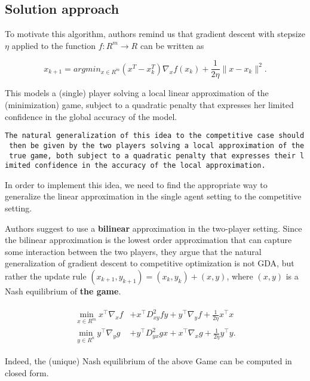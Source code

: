 \documentclass[11pt]{article}
\begin{document}
    \subsection{Solution approach}\label{solution-approach}

To motivate this algorithm, authors remind us that gradient descent with
stepsize \(\eta\) applied to the function \(f:R^m \longrightarrow R\)
can be written as

\begin{equation}
        x_{k+1} = argmin_{x \in R^m} (x^T - x_{k}^T) \nabla_x f(x_k) + \frac{1}{2\eta} \|x - x_{k}\|^2.
    \end{equation}

This models a (single) player solving a local linear approximation of
the (minimization) game, subject to a quadratic penalty that expresses
her limited confidence in the global accuracy of the model.

\texttt{The\ natural\ generalization\ of\ this\ idea\ to\ the\ competitive\ case\ should\ then\ be\ given\ by\ the\ two\ players\ solving\ a\ local\ approximation\ of\ the\ true\ game,\ both\ subject\ to\ a\ quadratic\ penalty\ that\ expresses\ their\ limited\ confidence\ in\ the\ accuracy\ of\ the\ local\ approximation.}

In order to implement this idea, we need to find the appropriate way to
generalize the linear approximation in the single agent setting to the
competitive setting.

Authors suggest to use a \textbf{bilinear} approximation in the
two-player setting. Since the bilinear approximation is the lowest order
approximation that can capture some interaction between the two players,
they argue that the natural generalization of gradient descent to
competitive optimization is not GDA, but rather the update rule
\((x_{k+1},y_{k+1}) = (x_k,y_k) + (x,y)\), where \((x,y)\) is a Nash
equilibrium of \textbf{the game}.

\begin{align}
    \begin{split}
    \label{eqn:localgame}
    \min_{x \in R^m} x^{\top} \nabla_x f &+ x^{\top} D_{xy}^2 f y + y^{\top} \nabla_y f + \frac{1}{2\eta} x^{\top} x \\
    \min_{y \in R^n}  y^{\top} \nabla_y g &+ y^{\top} D_{yx}^2 g x + x^{\top} \nabla_x g + \frac{1}{2\eta} y^{\top} y.
    \end{split}
\end{align}

Indeed, the (unique) Nash equilibrium of the above Game can be computed
in closed form.
\end{document}
